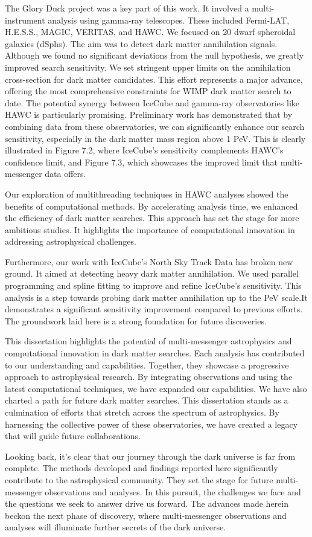 The Glory Duck project was a key part of this work.
It involved a multi-instrument analysis using gamma-ray telescopes. These included Fermi-LAT, H.E.S.S., MAGIC, VERITAS, and HAWC.
We focused on 20 dwarf spheroidal galaxies (dSphs).
The aim was to detect dark matter annihilation signals.
Although we found no significant deviations from the null hypothesis, we greatly improved search sensitivity.
We set stringent upper limits on the annihilation cross-section for dark matter candidates.
This effort represents a major advance, offering the most comprehensive constraints for WIMP dark matter search to date.
The potential synergy between IceCube and gamma-ray observatories like HAWC is particularly promising.
Preliminary work has demonstrated that by combining data from these observatories, we can significantly enhance our search sensitivity, especially in the dark matter mass region above 1 PeV.
This is clearly illustrated in Figure 7.2, where IceCube's sensitivity complements HAWC's confidence limit, and Figure 7.3, which showcases the improved limit that multi-messenger data offers.

Our exploration of multithreading techniques in HAWC analyses showed the benefits of computational methods.
By accelerating analysis time, we enhanced the efficiency of dark matter searches. This approach has set the stage for more ambitious studies.
It highlights the importance of computational innovation in addressing astrophysical challenges.

Furthermore, our work with IceCube's North Sky Track Data has broken new ground.
It aimed at detecting heavy dark matter annihilation.
We used parallel programming and spline fitting to improve and refine IceCube's  sensitivity.
This analysis is a step towards probing dark matter annihilation up to the PeV scale.It demonstrates a significant sensitivity improvement compared to previous efforts. The groundwork laid here is a strong foundation for future discoveries.

This dissertation highlights the potential of multi-messenger astrophysics and computational innovation in dark matter searches.
Each analysis has contributed to our understanding and capabilities.
Together, they showcase a progressive approach to astrophysical research.
By integrating observations and using the latest computational techniques, we have expanded our capabilities.
We have also charted a path for future dark matter searches.
This dissertation stands as a culmination of efforts that stretch across the spectrum of astrophysics.
By harnessing the collective power of these observatories, we have created a legacy that will guide future collaborations.

Looking back, it's clear that our journey through the dark universe is far from complete.
The methods developed and findings reported here significantly contribute to the astrophysical community.
They set the stage for future multi-messenger observations and analyses.
In this pursuit, the challenges we face and the questions we seek to answer drive us forward.
The advances made herein beckon the next phase of discovery, where multi-messenger observations and analyses will illuminate further secrets of the dark universe.
